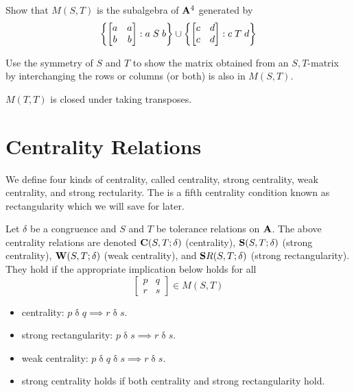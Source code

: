 \begin{exercises}

\prob
Show that $M(S,T)$ is the subalgebra of $\mathbf{A}^4$ generated by
\[
\left\{
\begin{bmatrix}
a&a\\
b&b
\end{bmatrix} : a \mathrel{S} b\right\}
\union
\left\{
\begin{bmatrix}
c&d\\
c&d
\end{bmatrix} : c \mathrel{T} d\right\}
\]

\prob
Use the symmetry of $S$ and $T$ to show the matrix obtained from an
$S,T$-matrix by interchanging the rows or columns (or both) is also
in $M(S,T)$. 

\prob
$M(T,T)$ is closed under taking transposes. 

\end{exercises}

\section*{Centrality Relations}

We define four kinds of centrality, called centrality, strong
centrality, weak centrality, and strong rectularity. The is a fifth
centrality condition known as rectangularity which we will save for
later.

Let $\delta$ be a congruence and $S$ and $T$ be
tolerance relations on  $\mathbf{A}$. The above centrality relations
are denoted $\mathbf{C}(S,T;\delta)$ (centrality), 
$\mathbf{S}(S,T;\delta)$ (strong centrality), 
$\mathbf{W}(S,T;\delta)$ (weak centrality),  and
$\mathbf{S}R(S,T;\delta)$ (strong rectangularity). They hold if the
appropriate implication below holds for all 
\[
\begin{bmatrix}
p&q\\
r&s
\end{bmatrix} \in M(S,T)
\]
\begin{itemize}
\item centrality: 
$p \mathrel{\delta} q \implies r \mathrel{\delta} s$.
\item strong rectangularity: 
$p \mathrel{\delta} s \implies r \mathrel{\delta} s$.
\item weak centrality: 
$p \mathrel{\delta} q \mathrel{\delta} s \implies r \mathrel{\delta} s$.
\item strong centrality holds if both centrality and strong
rectangularity hold.
\end{itemize}

